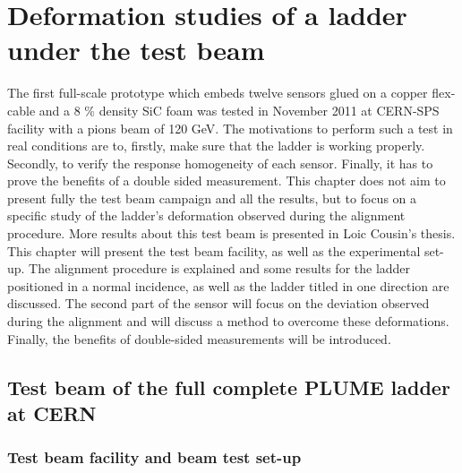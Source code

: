 \chapter{Deformation studies of a ladder under the test beam}

  The first full-scale prototype which embeds twelve sensors glued on a copper flex-cable and a 8 \% density \gls{SiC} foam was tested in November 2011 at CERN-SPS facility with a pions beam of 120 GeV.
  The motivations to perform such a test in real conditions are to, firstly, make sure that the ladder is working properly.
  Secondly, to verify the response homogeneity of each sensor.
  Finally, it has to prove the benefits of a double sided measurement.
  This chapter does not aim to present fully the test beam campaign and all the results, but to focus on a specific study of the ladder's deformation observed during the alignment procedure.
  More results about this test beam is presented in Loic Cousin's thesis\cite{cousin}.
  This chapter will present the test beam facility, as well as the experimental set-up.
  The alignment procedure is explained and some results for the ladder positioned in a normal incidence, as well as the ladder titled in one direction are discussed.
  The second part of the sensor will focus on the deviation observed during the alignment and will discuss a method to overcome these deformations.
  Finally, the benefits of double-sided measurements will be introduced.
  
  \minitoc

  \section{Test beam of the full complete PLUME ladder at CERN}

    \subsection{Test beam facility and beam test set-up}

